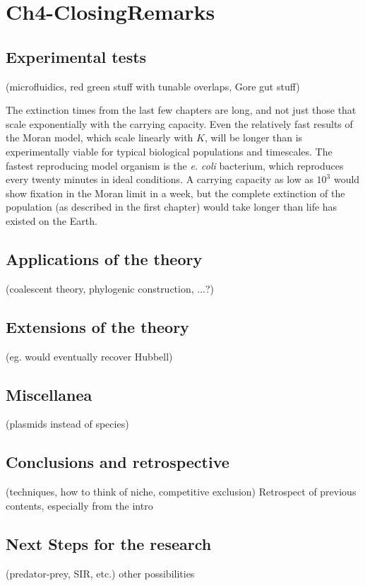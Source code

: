 \chapter{Ch4-ClosingRemarks}

\section{Experimental tests}
 (microfluidics, red green stuff with tunable overlaps, Gore gut stuff)

The extinction times from the last few chapters are long, and not just those that scale exponentially with the carrying capacity. 
Even the relatively fast results of the Moran model, which scale linearly with $K$, will be longer than is experimentally viable for typical biological populations and timescales. 
The fastest reproducing model organism is the \emph{e. coli} bacterium, which reproduces every twenty minutes in ideal conditions. 
A carrying capacity as low as $10^3$ would show fixation in the Moran limit in a week, but the complete extinction of the population (as described in the first chapter) would take longer than life has existed on the Earth. %



\section{Applications of the theory}
 (coalescent theory, phylogenic construction, ...?)


\section{Extensions of the theory}
 (eg. would eventually recover Hubbell)


\section{Miscellanea}
 (plasmids instead of species)


\section{Conclusions and retrospective}
 (techniques, how to think of niche, competitive exclusion)
Retrospect of previous contents, especially from the intro


\section{Next Steps for the research}
 (predator-prey, SIR, etc.)
 other possibilities

